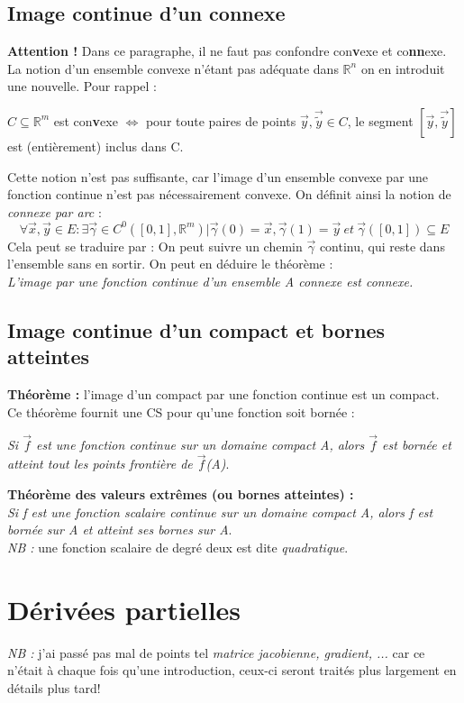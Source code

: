 \documentclass	[11pt, a4paper, openany]{book}
\begin{document}
\subsection{Image continue d'un connexe}
\textbf{Attention !} Dans ce paragraphe, il ne faut pas confondre con\textbf{v}exe et co\textbf{nn}exe. La notion d'un ensemble convexe n'étant pas adéquate dans $\mathbb{R}^n$ on en introduit une nouvelle. Pour rappel :
\begin{center}
$C \subseteq \mathbb{R}^m$ est con\textbf{v}exe $\Leftrightarrow$ pour toute paires de points $\vec{y}, \vec{\tilde{y}} \in C$, le segment $[\vec{y}, \vec{\tilde{y}}]$ est (entièrement) inclus dans C.
\end{center}
Cette notion n'est pas suffisante, car l'image d'un ensemble convexe par une fonction continue n'est pas nécessairement convexe. On définit ainsi la notion de \textit{connexe par arc} :
$$\forall \vec{x}, \vec{y} \in E : \exists \vec{\gamma} \in C^0([0,1], \mathbb{R}^m) | \vec{\gamma}(0) = \vec{x}, \vec{\gamma}(1) = \vec{y}\ et\  \vec{\gamma}([0,1]) \subseteq E$$
Cela peut se traduire par : On peut suivre un chemin $\vec{\gamma}$ continu, qui reste dans l'ensemble sans en sortir. On peut en déduire le théorème :\\
\textit{L'image par une fonction continue d'un ensemble A connexe est connexe.}

\subsection{Image continue d'un compact et bornes atteintes}
\textbf{Théorème :} l'image d'un compact par une fonction continue est un compact.\\
Ce théorème fournit une CS pour qu'une fonction soit bornée :
\begin{center}
\textit{Si $\vec{f}$ est une fonction continue sur un domaine compact A, alors $\vec{f}$ est bornée et atteint tout les points frontière de $\vec{f}$(A)}.
\end{center}
\textbf{Théorème des valeurs extrêmes (ou bornes atteintes) :}\\
\textit{Si f est une fonction \emph{scalaire} continue sur un domaine compact A, alors f est bornée sur A et atteint ses bornes sur A}.\\

\textit{NB :} une fonction scalaire de degré deux est dite \textit{quadratique}.

\section{Dérivées partielles}
\textit{NB :} j'ai passé pas mal de points tel \textit{matrice jacobienne, gradient, ...} car ce n'était à chaque fois qu'une introduction, ceux-ci seront traités plus largement en détails plus tard!
\end{document}
